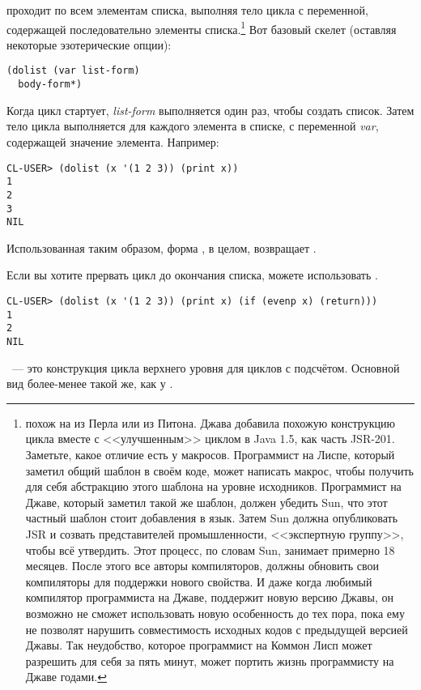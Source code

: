  проходит по всем элементам списка, выполняя тело цикла с переменной,
содержащей последовательно элементы списка.\footnote{ похож на 
  из Перла или  из Питона. Джава добавила похожую конструкцию цикла вместе с
  <<улучшенным>>  циклом в Java 1.5, как часть JSR-201. Заметьте, какое отличие
  есть у макросов. Программист на Лиспе, который заметил общий шаблон в своём коде, может
  написать макрос, чтобы получить для себя абстракцию этого шаблона на уровне
  исходников. Программист на Джаве, который заметил такой же шаблон, должен убедить Sun,
  что этот частный шаблон стоит добавления в язык. Затем Sun должна опубликовать JSR и
  созвать представителей промышленности, <<экспертную группу>>, чтобы всё утвердить. Этот
  процесс, по словам Sun, занимает примерно 18 месяцев. После этого все авторы
  компиляторов, должны обновить свои компиляторы для поддержки нового свойства. И даже
  когда любимый компилятор программиста на Джаве, поддержит новую версию Джавы, он
  возможно не сможет использовать новую особенность до тех пора, пока ему не позволят
  нарушить совместимость исходных кодов с предыдущей версией Джавы. Так неудобство,
  которое программист на Коммон Лисп может разрешить для себя за пять минут, может портить
  жизнь программисту на Джаве годами.} Вот базовый скелет (оставляя некоторые
эзотерические опции):

\begin{lstlisting}
(dolist (var list-form)
  body-form*)
\end{lstlisting}

Когда цикл стартует, \textit{list-form} выполняется один раз, чтобы создать список. Затем
тело цикла выполняется для каждого элемента в списке, с переменной \textit{var},
содержащей значение элемента. Например:

\begin{lstlisting}
CL-USER> (dolist (x '(1 2 3)) (print x))
1
2
3
NIL
\end{lstlisting}

Использованная таким образом, форма , в целом, возвращает .

Если вы хотите прервать цикл  до окончания списка, можете использовать
.

\begin{lstlisting}
CL-USER> (dolist (x '(1 2 3)) (print x) (if (evenp x) (return)))
1
2
NIL
\end{lstlisting}

~--- это конструкция цикла верхнего уровня для циклов с подсчётом. Основной
вид более-менее такой же, как у .

